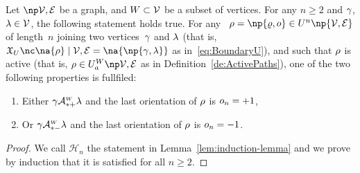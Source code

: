 \documentclass[12pt]{article}
\begin{document}
{{{{{\begin{lemma}
  Let \( \npOrientedGraph \) be a graph, 
  and $W\subset{\cal V}$ be a subset of vertices.
  For any $n\ge 2$ and $\gamma$, $\lambda \in {\cal V}$, the following statement
  holds true.
  For any
  \undirectedEdgePath\ \( \UndirectedPath = \np{\path,\orient} \in \UPATH^{n}\np{\graph} \) of length~$n$
  joining two vertices~$\gamma$ and $\lambda$ (that is,
  \( \BoundaryU{\na{\UndirectedPath}}{\graph}=\na{ \np{\bgent,\cgent} } \) as in~\eqref{eq:BoundaryU}), and
  such that \( \rho \) is active (that is,
  \( \UndirectedPath \in \ActiveUndirectedPaths{\graph} \) as in
  Definition~\ref{de:ActivePaths}), 
  one of the two following properties is fullfiled:
  \begin{enumerate}
  \item
    Either $\gamma\mathcal{A}^{\text{\tiny $W$}}_{*+} \lambda$ and
    the last orientation of $\rho$ is $o_n=+1$,
    \label{it:lem:induction-lemma_+1}
  \item
    Or $\gamma\mathcal{A}^{\text{\tiny $W$}}_{*-} \lambda$ and
    the last orientation of $\rho$ is $o_n=-1$.
    \label{it:lem:induction-lemma_-1}
  \end{enumerate}
  \label{lem:induction-lemma}
\end{lemma}


\begin{proof}
  We call ${\mathcal H}_{n}$ the statement in Lemma~\ref{lem:induction-lemma}
  and we prove by induction that it is satisfied for all $n\ge 2$.
  \medskip


\end{proof}}}}}}
\end{document}
